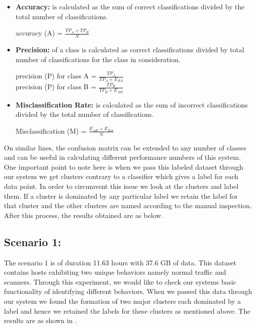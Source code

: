 \begin{itemize}
	\item \textbf{Accuracy:} is calculated as the sum of correct classifications divided by the total number of classifications.
	\begin{center}
		\centering accuracy (A) = $ \frac{TP_A + TP_B}{N}$
	\end{center}
	 

	\item \textbf{Precision:} of a class is calculated as correct classifications divided by total number of classifications for the class in consideration.
	\begin{center}
		\centering precision (P) for class A = $ \frac{TP_A}{TP_A + E_{BA}}$ \\
		\centering precision (P) for class B = $ \frac{TP_B}{TP_B + E_{AB}}$
	\end{center}
	
	\item \textbf{Misclassification Rate:} is calculated as the sum of incorrect classifications divided by the total number of classifications.
	\begin{center}
		\centering Misclassification (M) = $ \frac{E_{AB} + E_{BA}}{N}$
	\end{center}
	
\end{itemize}

On similar lines, the confusion matrix can be extended to any number of classes and can be useful in calculating different performance numbers of this system. One important point to note here is when we pass this labeled dataset through our system we get clusters contrary to a classifier which gives a label for each data point. In order to circumvent this issue we look at the clusters and label them. If a cluster is dominated by any particular label we retain the label for that cluster and the other clusters are named according to the manual inspection. After this process, the results obtained are as below. 



\subsection{Scenario 1:}
The scenario 1 is of duration 11.63 hours with 37.6 GB of data. This dataset contains hosts exhibiting two unique behaviors namely normal traffic and scanners. Through this experiment, we would like to check our systems basic functionality of identifying different behaviors. When we passed this data through our system we found the formation of two major clusters each dominated by a label and hence we retained the labels for these clusters as mentioned above. The results are as shown in  . 



